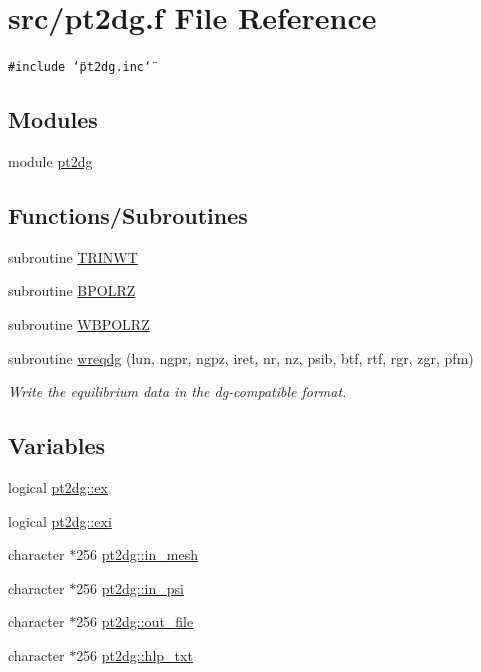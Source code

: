 \hypertarget{pt2dg_8f}{
\section{src/pt2dg.f File Reference}
\label{pt2dg_8f}
}
{\tt \#include \char`\"{}pt2dg.inc\char`\"{}}\par
\subsection*{Modules}
\begin{CompactItemize}
\item 
module \hyperlink{namespacept2dg}{pt2dg}
\end{CompactItemize}
\subsection*{Functions/Subroutines}
\begin{CompactItemize}
\item 
subroutine \hyperlink{pt2dg_8f_b954ece6618d5879ab91cf37b0735a5a}{TRINWT}
\item 
subroutine \hyperlink{pt2dg_8f_6512103c7c194607f9a5868f70673f38}{BPOLRZ}
\item 
subroutine \hyperlink{pt2dg_8f_a8661f7bb97ebf7d6b7eb7389a5bfe41}{WBPOLRZ}
\item 
subroutine \hyperlink{pt2dg_8f_9b1f405bcdbc8d49e53245d70506b459}{wreqdg} (lun, ngpr, ngpz, iret, nr, nz, psib, btf, rtf, rgr, zgr, pfm)
\begin{CompactList}\small\item\em Write the equilibrium data in the dg-compatible format. \item\end{CompactList}\end{CompactItemize}
\subsection*{Variables}
\begin{CompactItemize}
\item 
logical \hyperlink{namespacept2dg_a7bbc2ad42320beb17f6b9b32d04782a}{pt2dg::ex}
\item 
logical \hyperlink{namespacept2dg_8d34f10ebcb05cf92fd9c45ef5fd2d21}{pt2dg::exi}
\item 
character $\ast$256 \hyperlink{namespacept2dg_eda9f0cb998f1a0f90278f6e346b0078}{pt2dg::in\_\-mesh}
\item 
character $\ast$256 \hyperlink{namespacept2dg_a7a9a6418c143ad919a63ee5a58cd4a9}{pt2dg::in\_\-psi}
\item 
character $\ast$256 \hyperlink{namespacept2dg_33730b097575dd7213ab08bcf86ffb0b}{pt2dg::out\_\-file}
\item 
character $\ast$256 \hyperlink{namespacept2dg_33f7cd692337d17317294fdb06b21913}{pt2dg::hlp\_\-txt}
\end{CompactItemize}


